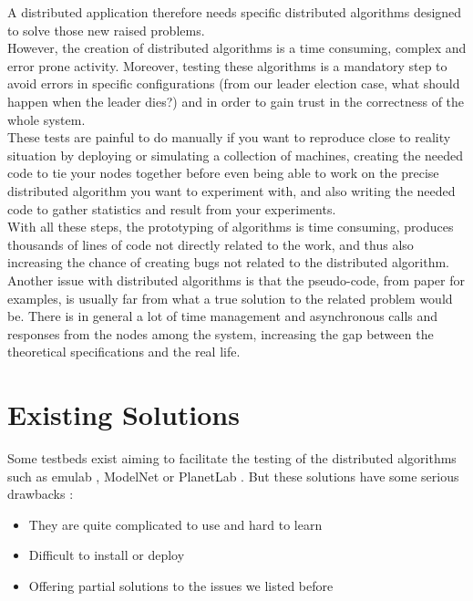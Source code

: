 \documentclass{eplmastersthesis}
\begin{document}
      A distributed application therefore needs specific distributed algorithms
      designed to solve those new raised problems.\\

      However, the creation of distributed algorithms is a time consuming,
      complex and error prone activity. Moreover, testing these algorithms is
      a mandatory step to avoid errors in specific configurations (from our
      leader election case, what should happen when the leader dies?) and in
      order to gain trust in the correctness of the whole system.\\
      These tests are painful to do manually if you want to reproduce close
      to reality situation by deploying or simulating a collection of machines,
      creating the needed code to tie your nodes together before even being
      able to work on the precise distributed algorithm you want to experiment
      with, and also writing the needed code to gather statistics and result
      from your experiments.\\
      With all these steps, the prototyping of algorithms is time consuming,
      produces thousands of lines of code not directly related to the work,
      and thus also increasing the chance of creating bugs not related to the
      distributed algorithm.\\

      Another issue with distributed algorithms is that the pseudo-code,
      from paper for examples, is usually far from what a true solution to the
      related problem would be. There is in general a lot of time management
      and asynchronous calls and responses from the nodes among the system,
      increasing the gap between the theoretical specifications and the real
      life.

    \section{Existing Solutions}

      Some testbeds exist aiming to facilitate the testing of the
      distributed algorithms such as emulab \cite{Emulab}, ModelNet
      \cite{ModelNet} or PlanetLab \cite{PlanetLab}. But these solutions have
      some serious drawbacks :

      \begin{itemize}
        \item They are quite complicated to use and hard to learn
        \item Difficult to install or deploy
        \item Offering partial solutions to the issues we listed before
      \end{itemize}
\end{document}

